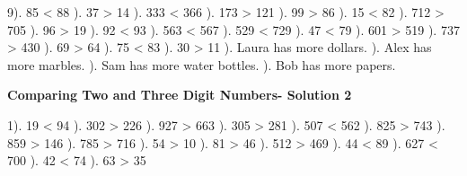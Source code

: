 \documentclass{article}%
\begin{document}
9). 85 < 88%
). 37 > 14%
). 333 < 366%
). 173 > 121%
). 99 > 86%
). 15 < 82%
). 712 > 705%
). 96 > 19%
). 92 < 93%
). 563 < 567%
). 529 < 729%
). 47 < 79%
). 601 > 519%
). 737 > 430%
). 69 > 64%
). 75 < 83%
). 30 > 11%
). Laura has more dollars.%
). Alex has more marbles.%
). Sam has more water bottles.%
). Bob has more papers.%
\newline%
\newpage%
\large%
\begin{center}%
\textbf{Comparing Two and Three Digit Numbers- Solution 2}%
\newline%
\end{center} \normalsize%
1). 19 < 94%
). 302 > 226%
). 927 > 663%
). 305 > 281%
). 507 < 562%
). 825 > 743%
). 859 > 146%
). 785 > 716%
). 54 > 10%
). 81 > 46%
). 512 > 469%
). 44 < 89%
). 627 < 700%
). 42 < 74%
). 63 > 35%
\newline%
\end{document}
